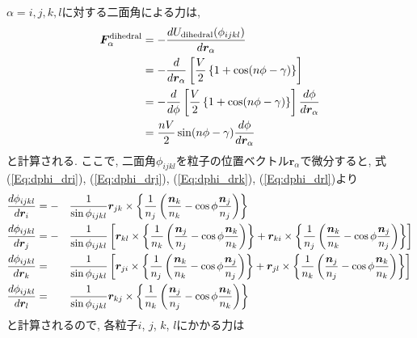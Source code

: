 $\alpha = i, j, k, l$に対する二面角による力は, 
\begin{align}
     \bm{F}_{\alpha}^{\mathrm{dihedral}}
 &=
   - \frac{d U_{\mathrm{dihedral}}(\phi_{ijkl})}{d \bm{r}_{\alpha}}
 \notag \\
 &=
   - \frac{d}{d \bm{r}_{\alpha}}
     \left[
            \frac{V}{2}
            \left\{ 1 + \cos(n\phi-\gamma) \right\}
     \right]
 \notag \\
 &=
   - \frac{d}{d \phi}
     \left[
            \frac{V}{2}
            \left\{ 1 + \cos(n\phi-\gamma) \right\}
     \right]
     \frac{d \phi}{d \bm{r}_{\alpha}}
 \notag \\
 &=
 \frac{nV}{2} \sin(n\phi - \gamma) \frac{d \phi}{d \bm{r}_{\alpha}}
 \notag
\end{align}
と計算される. ここで, 二面角$\phi_{ijkl}$を粒子の位置ベクトル$\bm{r}_{\alpha}$で微分すると,
式(\ref{Eq:dphi_dri}), (\ref{Eq:dphi_drj}), (\ref{Eq:dphi_drk}), (\ref{Eq:dphi_drl})より
\begin{alignat}{4}
   \frac{d \phi_{ijkl}}{d \bm{r}_{i}}
   &=
   -&&
   \frac{1}{\sin \phi_{ijkl}}
   \bm{r}_{jk} \times
   \left\{
          \frac{1}{n_{j}}
          \left(
                 \frac{\bm{n}_{k}}{n_{k}} - \cos\phi \frac{\bm{n}_{j}}{n_{j}}
          \right)
   \right\}
   \notag
   \\
   \frac{d \phi_{ijkl}}{d \bm{r}_{j}}
   &=
   -&&
   \frac{1}{\sin \phi_{ijkl}}
   \left[
      \bm{r}_{kl} \times
      \left\{
             \frac{1}{n_{k}}
             \left(
                    \frac{\bm{n}_{j}}{n_{j}} - \cos\phi \frac{\bm{n}_{k}}{n_{k}}
             \right)
      \right\}
    +
      \bm{r}_{ki} \times
      \left\{
             \frac{1}{n_{j}}
             \left(
                    \frac{\bm{n}_{k}}{n_{k}} - \cos\phi \frac{\bm{n}_{j}}{n_{j}}
             \right)
      \right\}
   \right]
   \notag
   \\
   \frac{d \phi_{ijkl}}{d \bm{r}_{k}}
   &=&&
   \frac{1}{\sin \phi_{ijkl}}
   \left[
      \bm{r}_{ji} \times
      \left\{
             \frac{1}{n_{j}}
             \left(
                    \frac{\bm{n}_{k}}{n_{k}} - \cos\phi \frac{\bm{n}_{j}}{n_{j}}
             \right)
      \right\}
    +
      \bm{r}_{jl} \times
      \left\{
             \frac{1}{n_{k}}
             \left(
                    \frac{\bm{n}_{j}}{n_{j}} - \cos\phi \frac{\bm{n}_{k}}{n_{k}}
             \right)
      \right\}
   \right]
   \notag
   \\
   \frac{d \phi_{ijkl}}{d \bm{r}_{l}}
   &=&&
   \frac{1}{\sin \phi_{ijkl}}
   \bm{r}_{kj} \times
   \left\{
          \frac{1}{n_{k}}
          \left(
                 \frac{\bm{n}_{j}}{n_{j}} - \cos\phi \frac{\bm{n}_{k}}{n_{k}}
          \right)
   \right\}
   \notag
\end{alignat}
と計算されるので, 各粒子$i$, $j$, $k$, $l$にかかる力は

